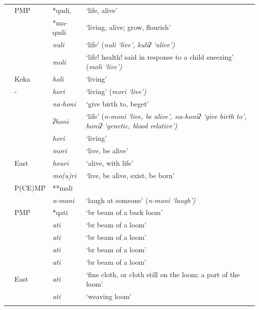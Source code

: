 {\wg\begin{xltabular}{\linewidth}{>{\hspace{-\tabcolsep}}l<{\hspace{-\tabcolsep}}>{\hspace{-\tabcolsep}\enspace}llX}
\lsptoprule
{}	&	PMP	&	*qudi,	&	‘life, alive’\\ \hhline{~}
	&		&	*ma-qudi	&	‘living, alive; grow, flourish’\\  \midrule\hhline{~}
	&	 	&	\it{nuli}	&	‘life’ (\it{nuli} ‘live’, \it{kuliʔ} ‘alive’)\\
	&		&	\it{moli}	&	‘life! health! said in response to a child sneezing’ (\it{moli} ‘live’)\\
	&	Keka	&	\it{holi} 	&	‘living’\\
	&	-	&	\it{hori}	&	‘living’ (\it{mori} ‘live’)\\
	&	 	&	\it{na-honi}	&	‘give birth to, beget’\\
	&		&	\it{ʔhoni}	&	‘life’ (\it{n-moni} ‘live, be alive’, \it{na-honiʔ} ‘give birth to’, \it{honiʔ} ‘genetic, blood relative’)\\
	&	 	&	\it{hori}	&	‘living’\\
	&		&	\it{mori}	&	‘live, be alive’\\
	&	East 	&	\it{houri}	&	‘alive, with life’\\
	&		&	\it{mo(u)ri}	&	‘live, be alive, exist, be born’\\  \midrule\hhline{~}
	&	P(CE)MP	&	**mali	&	\hp{ }\\
	&		&	\it{n-mani}	&	‘laugh at someone’ (\it{n-mani} ‘laugh’)\\  \midrule\hhline{~}
	&	PMP 	&	*qati	&	‘br beam of a back loom’\\
	&	 	&	\it{ati}	&	‘br beam of a loom’\\
	&		&	\it{ati}	&	‘br beam of a loom’\\
	&		&	\it{ati}	&	‘br beam of a loom’\\
	&	 	&	\it{ati}	&	‘br beam of a loom’\\
	&	East 	&	\it{ati}	&	‘fine cloth, or cloth still on the loom; a part of the loom’\\
	&		&	\it{ati}	&	‘weaving loom’\\
\lspbottomrule
\end{xltabular}\addtocounter{table}{-1}}

